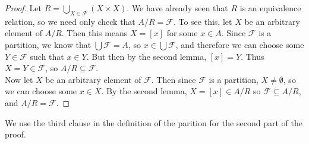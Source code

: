 \documentclass{report}
\theoremstyle{definition}
\begin{document}
\begin{proof}
Let $R=\bigcup_{X\in\mathcal F}(X\times X)$. We have already seen that $R$ is an equivalence relation, so we need only check that $A/R=\mathcal F$. To see this, let $X$ be an arbitrary
element of $A/R$. Then this means $X=[x]$ for some $x\in A$. Since $\mathcal F$ is a partition, we know that $\bigcup\mathcal F=A$, so $x\in\bigcup\mathcal F$, and therefore we can choose
some $Y\in\mathcal F$ such that $x\in Y$. But then by the second lemma, $[x]=Y$. Thus $X=Y\in\mathcal F$, so $A/R\subseteq\mathcal F$.\\
\indent Now let $X$ be an arbitrary element of $\mathcal F$. Then since $\mathcal F$ is a partition, $X\neq\emptyset$, so we can choose some $x\in X$. By the second lemma, 
$X=[x]\in A/R$ so $\mathcal F\subseteq A/R$, and $A/R=\mathcal F$.
\end{proof}
\noindent We use the third clause in the definition of the parition for the second part of the proof.
\newpage
\end{document}
